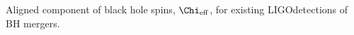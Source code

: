  \label{fig:BHspin} Aligned component of black hole spins, $\Chi_{\rm eff}$, for existing LIGOdetections of BH mergers.